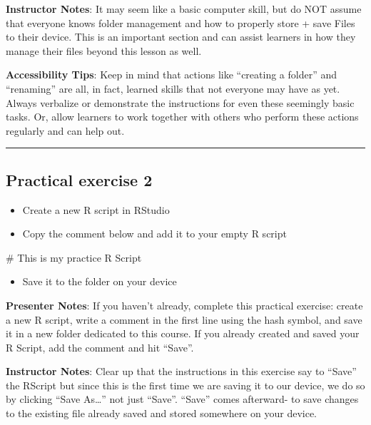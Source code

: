\documentclass[
  letterpaper,
  DIV=11,
  numbers=noendperiod]{scrartcl}
\newenvironment{Shaded}{\begin{snugshade}}{\end{snugshade}}
\newcommand{\CommentTok}[1]{\textcolor[rgb]{0.37,0.37,0.37}{#1}}
\providecommand{\tightlist}{%
  \setlength{\itemsep}{0pt}\setlength{\parskip}{0pt}}
\begin{document}
\textbf{Instructor Notes}: It may seem like a basic computer skill, but
do NOT assume that everyone knows folder management and how to properly
store + save Files to their device. This is an important section and can
assist learners in how they manage their files beyond this lesson as
well.

\textbf{Accessibility Tips}: Keep in mind that actions like ``creating a
folder'' and ``renaming'' are all, in fact, learned skills that not
everyone may have as yet. Always verbalize or demonstrate the
instructions for even these seemingly basic tasks. Or, allow learners to
work together with others who perform these actions regularly and can
help out.

\begin{center}\rule{0.5\linewidth}{0.5pt}\end{center}

\subsection{Practical exercise 2}\label{practical-exercise-2}

\begin{itemize}
\tightlist
\item[$\square$]
  Create a new R script in RStudio
\item[$\square$]
  Copy the comment below and add it to your empty R script
\end{itemize}

\begin{Shaded}
\begin{Highlighting}[]
\CommentTok{\# This is my practice R Script}
\end{Highlighting}
\end{Shaded}

\begin{itemize}
\tightlist
\item[$\square$]
  Save it to the folder on your device
\end{itemize}

\textbf{Presenter Notes}: If you haven't already, complete this
practical exercise: create a new R script, write a comment in the first
line using the hash symbol, and save it in a new folder dedicated to
this course. If you already created and saved your R Script, add the
comment and hit ``Save''.

\textbf{Instructor Notes}: Clear up that the instructions in this
exercise say to ``Save'' the RScript but since this is the first time we
are saving it to our device, we do so by clicking ``Save As\ldots{}''
not just ``Save''. ``Save'' comes afterward- to save changes to the
existing file already saved and stored somewhere on your device.
\end{document}
